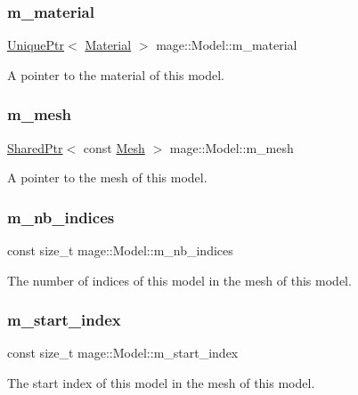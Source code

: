 \subsubsection{\texorpdfstring{m\+\_\+material}{m\_material}}
{\footnotesize\ttfamily \hyperlink{namespacemage_a3316d7143a973e37adf1110f2e80ca31}{Unique\+Ptr}$<$ \hyperlink{classmage_1_1_material}{Material} $>$ mage\+::\+Model\+::m\+\_\+material\hspace{0.3cm}{\ttfamily [private]}}

A pointer to the material of this model. \hypertarget{classmage_1_1_model_aecd2b4031c5df30fb5f7ed6d62810f73}{}\label{classmage_1_1_model_aecd2b4031c5df30fb5f7ed6d62810f73} 
\subsubsection{\texorpdfstring{m\+\_\+mesh}{m\_mesh}}
{\footnotesize\ttfamily \hyperlink{namespacemage_a1e01ae66713838a7a67d30e44c67703e}{Shared\+Ptr}$<$ const \hyperlink{classmage_1_1_mesh}{Mesh} $>$ mage\+::\+Model\+::m\+\_\+mesh\hspace{0.3cm}{\ttfamily [private]}}

A pointer to the mesh of this model. \hypertarget{classmage_1_1_model_a1fcf80ed9f3002bd2319ef83f073ae75}{}\label{classmage_1_1_model_a1fcf80ed9f3002bd2319ef83f073ae75} 
\subsubsection{\texorpdfstring{m\+\_\+nb\+\_\+indices}{m\_nb\_indices}}
{\footnotesize\ttfamily const size\+\_\+t mage\+::\+Model\+::m\+\_\+nb\+\_\+indices\hspace{0.3cm}{\ttfamily [private]}}

The number of indices of this model in the mesh of this model. \hypertarget{classmage_1_1_model_a63a3e697c9eb1606249de15cc7b818c3}{}\label{classmage_1_1_model_a63a3e697c9eb1606249de15cc7b818c3} 
\subsubsection{\texorpdfstring{m\+\_\+start\+\_\+index}{m\_start\_index}}
{\footnotesize\ttfamily const size\+\_\+t mage\+::\+Model\+::m\+\_\+start\+\_\+index\hspace{0.3cm}{\ttfamily [private]}}

The start index of this model in the mesh of this model. 